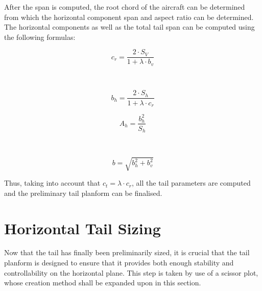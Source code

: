 After the span is computed, the root chord of the aircraft can be determined from which the horizontal component span and aspect ratio can be determined.
The horizontal components as well as the total tail span can be computed using the following formulas:

\begin{minipage}{0.45\linewidth}
    \begin{equation}
    c_r=\frac{2\cdot S_V}{{1+\lambda} \cdot b_v}
\end{equation}
\end{minipage}
~
\begin{minipage}{0.45\linewidth}
    \begin{equation}
    b_h=\frac{2\cdot S_h}{{1+\lambda} \cdot c_r}
\end{equation}
\end{minipage}

\begin{minipage}{0.45\linewidth}
\begin{equation}
    A_h=\frac{b_h^2}{S_h}
\end{equation}
\end{minipage}
~
\begin{minipage}{0.45\linewidth}
\begin{equation}
    b = \sqrt{b_h^2+b_v^2}
\end{equation}
\end{minipage}

Thus, taking into account that $c_t = \lambda \cdot c_r$, all the tail parameters are computed and the preliminary tail planform can be finalised.

\section{Horizontal Tail Sizing}
\label{sec:Horizontal_tail}
Now that the tail has finally been preliminarily sized, it is crucial that the tail planform is designed to ensure that it provides both enough stability and controllability on the horizontal plane.
This step is taken by use of a scissor plot, whose creation method shall be expanded upon in this section.

